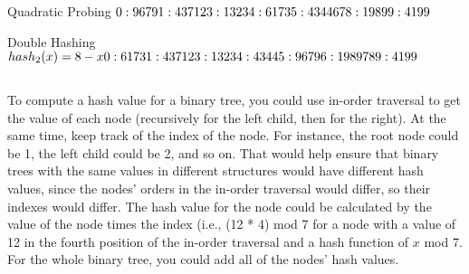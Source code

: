 \documentclass{article}
\begin{document}
\noindent Quadratic Probing
\newline
$0: 9679
\newline
1: 4371
\newline
2
\newline
3: 1323
\newline
4: 6173
\newline
5: 4344
\newline
6
\newline
7
\newline
8: 1989
\newline
\vspace{5mm} 9: 4199$

\noindent Double Hashing
\newline
$hash_2(x) = 8 - x %
\newline
0: 6173
\newline
1: 4371
\newline
2
\newline
3: 1323
\newline
4: 4344
\newline
5: 9679
\newline
6: 1989
\newline
7
\newline
8
\newline
9: 4199$

\subsection{}
To compute a hash value for a binary tree, you could use in-order traversal to get the value of each node (recursively for the left child, then for the right). At the same time, keep track of the index of the node. For instance, the root node could be 1, the left child could be 2, and so on. That would help ensure that binary trees with the same values in different structures would have different hash values, since the nodes' orders in the in-order traversal would differ, so their indexes would differ. The hash value for the node could be calculated by the value of the node times the index (i.e., (12 * 4) mod 7 for a node with a value of 12 in the fourth position of the in-order traversal and a hash function of $x$ mod 7. For the whole binary tree, you could add all of the nodes' hash values.
\end{document}
